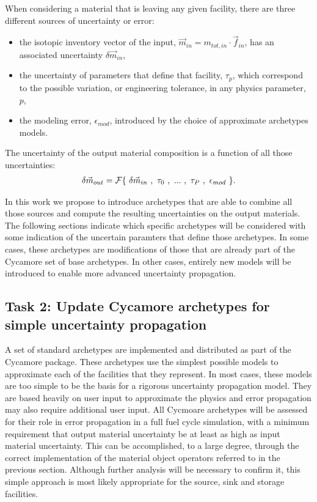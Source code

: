 \documentclass[dvips,12pt]{article}
\newcommand{\unc}[1]
{ \delta #1 }
\begin{document}
When considering a material that is leaving any
given facility, there are three different sources
of uncertainty or error:
\begin{itemize}
\item the isotopic inventory vector of the input,
  $\vec{m}_{in} = m_{tot,in} \cdot \vec{f}_{in}$,
  has an associated uncertainty $\unc{\vec{m}_{in}}$,
\item the uncertainty of parameters that define that
  facility, $\tau_{p}$, 
  which correspond to the possible
  variation, or engineering tolerance, in any physics parameter, $p$,
\item the modeling error, $\epsilon_{mod}$, introduced by
  the choice of approximate archetypes models.
\end{itemize}
The uncertainty of the output material composition is a
function of all those uncertainties:
\begin{align}
  \delta \vec{m}_{out} = 
         {\cal F}\{~\unc{\vec{m}_{in}}~,~\tau_0~,~...~,~\tau_P~,~\epsilon_{mod}~\}.
\end{align}

In this work we propose to introduce archetypes
that are able to combine all those sources and
compute the resulting uncertainties on the output
materials.  The following sections indicate which
specific archetypes will be considered with some
indication of the uncertain paramters that define
those archetypes.  In some cases, these archetypes
are modifications of those that are already part
of the Cycamore set of base archetypes.  In other
cases, entirely new models will be introduced to
enable more advanced uncertainty propagation.

\subsection{Task 2: Update Cycamore archetypes for simple uncertainty propagation}

A set of standard archetypes are implemented and
distributed as part of the Cycamore package.
These archetypes use the simplest possible models
to approximate each of the facilities that they
represent.  In most cases, these models are too
simple to be the basis for a rigorous uncertainty
propagation model.  They are based heavily on user
input to approximate the physics and error
propagation may also require additional user
input.  All Cycmoare archetypes will be assessed
for their role in error propagation in a full fuel
cycle simulation, with a minimum requirement that
output material uncertainty be at least as high as
input material uncertainty.  This can be
accomplished, to a large degree, through the
correct implementation of the material object
operators referred to in the previous section.
Although further analysis will be necessary to
confirm it, this simple approach is most likely
appropriate for the source, sink
and storage facilities.
\end{document}

